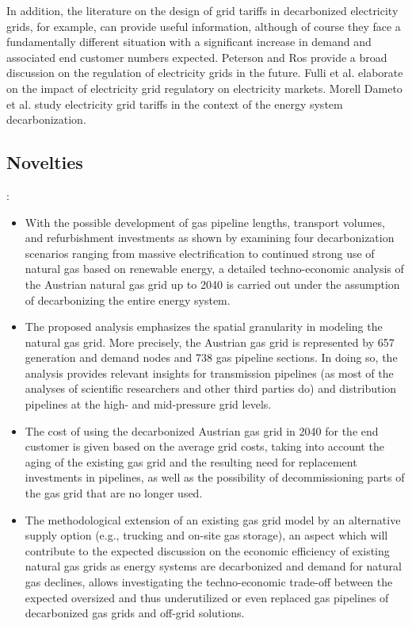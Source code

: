 In addition, the literature on the design of grid tariffs in decarbonized electricity grids, for example, can provide useful information, although of course they face a fundamentally different situation with a significant increase in demand and associated end customer numbers expected. Peterson and Ros \cite{peterson2018future} provide a broad discussion on the regulation of electricity grids in the future. Fulli et al. \cite{fulli2019change} elaborate on the impact of electricity grid regulatory on electricity markets. Morell Dameto et al. \cite{morell2020revisiting} study electricity grid tariffs in the context of the energy system decarbonization.

\subsection{Novelties }\label{novelties}
:

\begin{itemize}
	\item With the possible development of gas pipeline lengths, transport volumes, and refurbishment investments as shown by examining four decarbonization scenarios ranging from massive electrification to continued strong use of natural gas based on renewable energy, a detailed techno-economic analysis of the Austrian natural gas grid up to 2040 is carried out under the assumption of decarbonizing the entire energy system.
	\item The proposed analysis emphasizes the spatial granularity in modeling the natural gas grid. More precisely, the Austrian gas grid is represented by 657 generation and demand nodes and 738 gas pipeline sections. In doing so, the analysis provides relevant insights for transmission pipelines (as most of the analyses of scientific researchers and other third parties do) and distribution pipelines at the high- and mid-pressure grid levels.
	\item The cost of using the decarbonized Austrian gas grid in 2040 for the end customer is given based on the average grid costs, taking into account the aging of the existing gas grid and the resulting need for replacement investments in pipelines, as well as the possibility of decommissioning parts of the gas grid that are no longer used.
	\item The methodological extension of an existing gas grid model by an alternative supply option (e.g., trucking and on-site gas storage), an aspect which will contribute to the expected discussion on the economic efficiency of existing natural gas grids as energy systems are decarbonized and demand for natural gas declines, allows investigating the techno-economic trade-off between the expected oversized and thus underutilized or even replaced gas pipelines of decarbonized gas grids and off-grid solutions. 
\end{itemize}